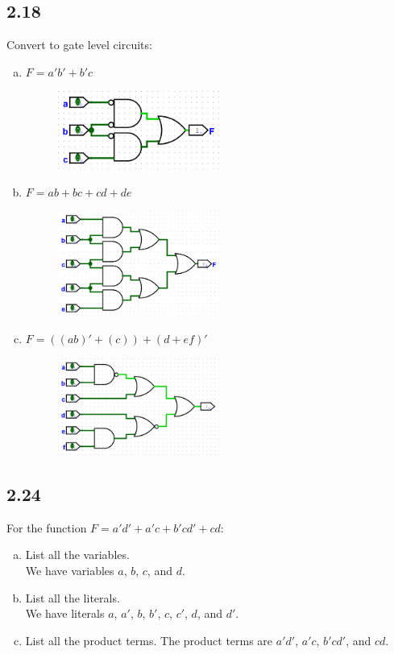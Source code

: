 \documentclass{article}
\begin{document}
\subsection*{2.18}
Convert to gate level circuits:
\begin{enumerate}[(a)]
    \item $F = a'b' + b'c$
    \begin{figure}[h]
        \centering
        \includegraphics[width=0.5\textwidth]{./images/2_18_a.png}
    \end{figure}
    \item $F = ab + bc + cd + de$
    \begin{figure}[h]
        \centering
        \includegraphics[width=0.5\textwidth]{./images/2_18_b.png}
    \end{figure}
    \item $F = ((ab)' + (c)) + (d + ef)'$
    \begin{figure}[h]
        \centering
        \includegraphics[width=0.5\textwidth]{./images/2_18_c.png}
    \end{figure}
\end{enumerate}

\subsection*{2.24}
For the function $F = a'd' + a'c + b'cd' + cd$:
\begin{enumerate}[(a)]
    \item List all the variables. \\
    We have variables $a$, $b$, $c$, and $d$.
    \item List all the literals. \\
    We have literals $a$, $a'$, $b$, $b'$, $c$, $c'$, $d$, and $d'$.
    \item List all the product terms.
    The product terms are $a'd'$, $a'c$, $b'cd'$, and $cd$.
\end{enumerate}
\end{document}
